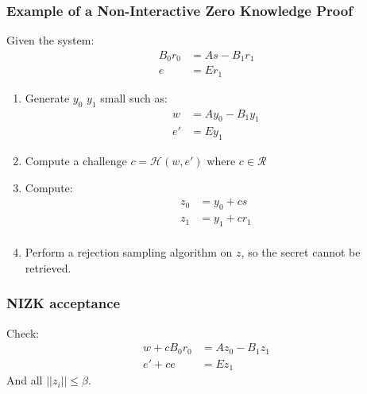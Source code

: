 \documentclass[presentation]{beamer}
\begin{document}
\begin{frame}[label=non-interactive-zero-knowledge-proof]
  \frametitle{Example of a Non-Interactive Zero Knowledge Proof}

  Given the system:
  \begin{equation*}
    \begin{array}{rl}
      B_0r_0 &= As - B_1r_1 \\
      e &= E r_1
    \end{array}
  \end{equation*}

  \begin{enumerate}
    \item Generate $y_0$ $y_1$ small such as:
      \begin{equation*}
        \begin{array}{rl}
          w  &= Ay_0 - B_1y_1 \\
          e' &= E y_1
        \end{array}
      \end{equation*}
    \item Compute a challenge $c = \mathcal H (w, e')$ where
      $c \in \mathcal R$
    \item Compute:
      \begin{equation*}
        \begin{array}{rl}
          z_0 &= y_0 + cs \\
          z_1 &= y_1 + cr_1 \\
        \end{array}
      \end{equation*}
    \item Perform a rejection sampling algorithm on $z$, 
      so the secret cannot be retrieved.
  \end{enumerate}
\end{frame}
\begin{frame}
  \frametitle{NIZK acceptance}

  Check:
  \begin{equation*}
    \begin{array}{rl}
      w + cB_0r_0 &= Az_0 - B_1z_1 \\
      e' + ce &= E z_1
    \end{array}
  \end{equation*}
  And all $||z_i|| \leq \beta$.
\end{frame}
\end{document}
